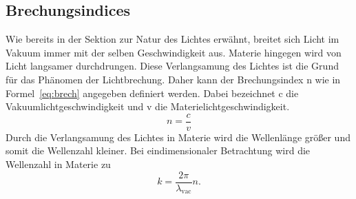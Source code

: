 \subsection{Brechungsindices}
Wie bereits in der Sektion zur Natur des Lichtes erwähnt, 
breitet sich Licht im Vakuum immer mit der selben Geschwindigkeit 
aus. Materie hingegen wird von Licht langsamer durchdrungen. 
Diese Verlangsamung des Lichtes ist die Grund für das Phänomen der 
Lichtbrechung. Daher kann der Brechungsindex n wie in 
Formel~\eqref{eq:brech} 
angegeben definiert werden. Dabei bezeichnet c die 
Vakuumlichtgeschwindigkeit und v die Materielichtgeschwindigkeit.
\begin{equation}
n = \frac{c}{v}
\label{eq:brech}
\end{equation}
Durch die Verlangsamung des Lichtes in Materie wird die Wellenlänge 
größer und somit die Wellenzahl kleiner. Bei eindimensionaler 
Betrachtung wird die Wellenzahl in Materie zu
\begin{equation*}
k = \frac{2\pi}{\lambda_\text{vac}}n.
\end{equation*}
